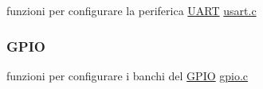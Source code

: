 \begin{DoxyItemize}
\item funzioni per configurare la periferica \hyperlink{structUART}{U\+A\+RT} \hyperlink{usart_8c}{usart.\+c} 
\end{DoxyItemize}\hypertarget{index_GPIO}{}\subsubsection{G\+P\+IO}\label{index_GPIO}

\begin{DoxyItemize}
\item funzioni per configurare i banchi del \hyperlink{structGPIO}{G\+P\+IO} \hyperlink{gpio_8c}{gpio.\+c} 
\end{DoxyItemize}
